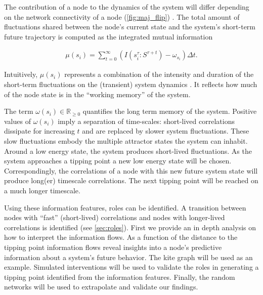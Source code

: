 \documentclass[a4paper, 11pt, twocolumn]{article}
\begin{document}
The contribution  of a  node to the  dynamics of  the system
will differ depending on the  network connectivity of a node
(\cref{fig:maj_flip})    \cite{vanElteren2022,Quax2013}.   The
total  amount  of  fluctuations shared  between  the  node's
current state and the  system's short-term future trajectory
is computed as the integrated mutual information

\begin{equation}
\label{eq:adj_imi}
\begin{split}
\mu(s_i) = \sum_{t = 0}^\infty (I(s_i^{\tau} : S^{\tau + t}) - \omega_{s_i}) \Delta t.
\end{split}
\end{equation}

Intuitively,  \(\mu(s_i)\)  represents   a  combination  of  the
intensity and duration of the short-term fluctuations on the
(transient) system dynamics \cite{vanElteren2022}. It reflects
how much of the node state is in the ``working memory'' of the
system.

The  term \(\omega(s_i)  \in \mathbb{R}_{\ge  0}\) quantifies  the long
term memory of the system. Positive values of \(\omega(s_i)\) imply
a  separation   of  time-scales:   short-lived  correlations
dissipate  for increasing  \(t\)  and are  replaced by  slower
system  fluctuations.  These  slow fluctuations  embody  the
multiple attractor  states the system can  inhabit. Around a
low   energy   state,   the  system   produces   short-lived
fluctuations. As the system approaches a tipping point a new
low  energy  state  will  be  chosen.  Correspondingly,  the
correlations of  a node  with this  new future  system state
will  produce  long(er)  timescale  correlations.  The  next
tipping point will be reached on a much longer timescale.

Using these information features,  roles can be identified. A
transition   between   nodes   with   ``fast''   (short-lived)
correlations  and nodes  with  longer-lived correlations  is
identified  (see  \ref{sec:roles}).
First we  provide an in  depth analysis on how  to interpret
the information flows. As a  function of the distance to the
tipping  point  information  flows reveal  insights  into  a
node's  predictive  information   about  a  system's  future
behavior.  The  kite  graph  will be  used  as  an  example.
Simulated interventions  will be used to  validate the roles
in   generating  a   tipping  point   identified  from   the
information features.  Finally, the random networks  will be
used to extrapolate and validate our findings.
\end{document}

